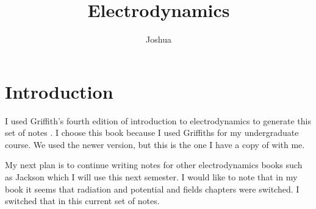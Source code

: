 \documentclass[preprint, review,12pt]{elsarticle}
\begin{document}
\begin{frontmatter}



\title{Electrodynamics}


\author{Joshua}



\end{frontmatter}



\tableofcontents

\section{Introduction}

I used Griffith's fourth edition of introduction to electrodynamics to generate this set of notes \cite{GriffithsEM}. I choose this book because I used Griffiths for my undergraduate course. We used the newer version, but this is the one I have a copy of with me. 

My next plan is to continue writing notes for other electrodynamics books such as Jackson which I will use this next semester. I would like to note that in my book it seems that radiation and potential and fields chapters were switched. I switched that in this current set of notes.
\end{document}
